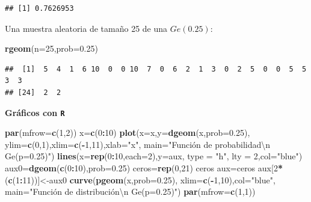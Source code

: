 \documentclass[]{book}
\newenvironment{Shaded}{\begin{snugshade}}{\end{snugshade}}
\newcommand{\CharTok}[1]{\textcolor[rgb]{0.31,0.60,0.02}{#1}}
\newcommand{\DataTypeTok}[1]{\textcolor[rgb]{0.13,0.29,0.53}{#1}}
\newcommand{\DecValTok}[1]{\textcolor[rgb]{0.00,0.00,0.81}{#1}}
\newcommand{\FloatTok}[1]{\textcolor[rgb]{0.00,0.00,0.81}{#1}}
\newcommand{\KeywordTok}[1]{\textcolor[rgb]{0.13,0.29,0.53}{\textbf{#1}}}
\newcommand{\NormalTok}[1]{#1}
\newcommand{\OperatorTok}[1]{\textcolor[rgb]{0.81,0.36,0.00}{\textbf{#1}}}
\newcommand{\StringTok}[1]{\textcolor[rgb]{0.31,0.60,0.02}{#1}}
\begin{document}
\begin{verbatim}
## [1] 0.7626953
\end{verbatim}

Una muestra aleatoria de tamaño 25 de una \(Ge(0.25)\):

\begin{Shaded}
\begin{Highlighting}[]
\KeywordTok{rgeom}\NormalTok{(}\DataTypeTok{n=}\DecValTok{25}\NormalTok{,}\DataTypeTok{prob=}\FloatTok{0.25}\NormalTok{)}
\end{Highlighting}
\end{Shaded}

\begin{verbatim}
##  [1]  5  4  1  6 10  0  0 10  7  0  6  2  1  3  0  2  5  0  0  5  5  3  3
## [24]  2  2
\end{verbatim}

\textbf{Gráficos con \texttt{R}}

\begin{Shaded}
\begin{Highlighting}[]
\KeywordTok{par}\NormalTok{(}\DataTypeTok{mfrow=}\KeywordTok{c}\NormalTok{(}\DecValTok{1}\NormalTok{,}\DecValTok{2}\NormalTok{))}
\NormalTok{x=}\KeywordTok{c}\NormalTok{(}\DecValTok{0}\OperatorTok{:}\DecValTok{10}\NormalTok{)}
\KeywordTok{plot}\NormalTok{(}\DataTypeTok{x=}\NormalTok{x,}\DataTypeTok{y=}\KeywordTok{dgeom}\NormalTok{(x,}\DataTypeTok{prob=}\FloatTok{0.25}\NormalTok{),}
  \DataTypeTok{ylim=}\KeywordTok{c}\NormalTok{(}\DecValTok{0}\NormalTok{,}\DecValTok{1}\NormalTok{),}\DataTypeTok{xlim=}\KeywordTok{c}\NormalTok{(}\OperatorTok{-}\DecValTok{1}\NormalTok{,}\DecValTok{11}\NormalTok{),}\DataTypeTok{xlab=}\StringTok{"x"}\NormalTok{,}
  \DataTypeTok{main=}\StringTok{"Función de probabilidad}\CharTok{\textbackslash{}n}\StringTok{ Ge(p=0.25)"}\NormalTok{)}
\KeywordTok{lines}\NormalTok{(}\DataTypeTok{x=}\KeywordTok{rep}\NormalTok{(}\DecValTok{0}\OperatorTok{:}\DecValTok{10}\NormalTok{,}\DataTypeTok{each=}\DecValTok{2}\NormalTok{),}\DataTypeTok{y=}\NormalTok{aux, }\DataTypeTok{type =} \StringTok{"h"}\NormalTok{, }\DataTypeTok{lty =} \DecValTok{2}\NormalTok{,}\DataTypeTok{col=}\StringTok{"blue"}\NormalTok{)}
\NormalTok{aux0=}\KeywordTok{dgeom}\NormalTok{(}\KeywordTok{c}\NormalTok{(}\DecValTok{0}\OperatorTok{:}\DecValTok{10}\NormalTok{),}\DataTypeTok{prob=}\FloatTok{0.25}\NormalTok{)}
\NormalTok{ceros=}\KeywordTok{rep}\NormalTok{(}\DecValTok{0}\NormalTok{,}\DecValTok{21}\NormalTok{)}
\NormalTok{ceros}
\NormalTok{aux=ceros}
\NormalTok{aux[}\DecValTok{2}\OperatorTok{*}\NormalTok{(}\KeywordTok{c}\NormalTok{(}\DecValTok{1}\OperatorTok{:}\DecValTok{11}\NormalTok{))]<-aux0}
\KeywordTok{curve}\NormalTok{(}\KeywordTok{pgeom}\NormalTok{(x,}\DataTypeTok{prob=}\FloatTok{0.25}\NormalTok{),}
  \DataTypeTok{xlim=}\KeywordTok{c}\NormalTok{(}\OperatorTok{-}\DecValTok{1}\NormalTok{,}\DecValTok{10}\NormalTok{),}\DataTypeTok{col=}\StringTok{"blue"}\NormalTok{,}
  \DataTypeTok{main=}\StringTok{"Función de distribución\textbackslash{}n Ge(p=0.25)"}\NormalTok{)}
\KeywordTok{par}\NormalTok{(}\DataTypeTok{mfrow=}\KeywordTok{c}\NormalTok{(}\DecValTok{1}\NormalTok{,}\DecValTok{1}\NormalTok{))}
\end{Highlighting}
\end{Shaded}
\end{document}
